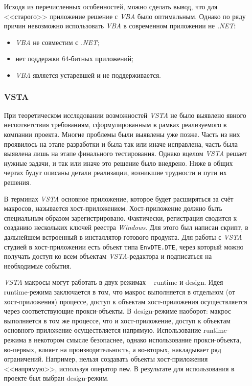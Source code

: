 Исходя из перечисленных особенностей, можно сделать вывод, что для <<старого>> приложение решение с {\it VBA} было оптимальным. Однако по ряду причин невозможно использовать {\it VBA} в современном приложении не {\it .NET}:

\begin{itemize}
   \item {\it VBA} не совместим с {\it .NET};
   \item нет поддержки 64-битных приложений;
   \item {\it VBA} является устаревшей и не поддерживается.
\end{itemize}


\subsubsection{VSTA}
\label{sec:use-itm-vsta}

При теоретическом исследовании возможностей {\it VSTA} не было выявлено явного несоответствия требованиям, сформулированным в рамках реализуемого в компании проекта. Многие проблемы были выявлены уже позже. Часть из них проявилось на этапе разработки и была так или иначе исправлена, часть была выявлена лишь на этапе финального тестирования. Однако вцелом {\it VSTA} решает нужные задачи, и так или иначе это решение было внедрено. Ниже в общих чертах будут описаны детали реализации, возникшие трудности и пути их решения.

В терминах {\it VSTA} основное приложение, которое будет расширяться за счёт макросов, называется хост-приложением. Хост-приложение должно быть специальным образом зарегистрировано. Фактически, регистрация сводится к созданию нескольких ключей реестра {\it Windows}. Для этого был написан скрипт, в дальнейшем встроенный в инсталлятор готового продукта. Для работы с {\it VSTA}-студией в хост-приложении есть объект типа {\tt EnvDTE.DTE}, через который можно получать доступ ко всем объектам {\it VSTA}-редактора и подписаться на необходимые события.

{\it VSTA}-макросы могут работать в двух режимах – runtime и design. Идея runtime-режима заключается в том, что макрос выполняется в отдельном (от хост-приложения) процессе, доступ к объектам хост-приложения осуществляется через соответствующие прокси-объекты. В design-режиме наоборот: макрос выполняется в том же процессе, что и хост-приложение, доступ к объектам основного приложение осуществляется напрямую. Использование runtime-режима в некотором смысле безопаснее, однако использование прокси-объекта, во-первых, влияет на производительность, а во-вторых, накладывает ряд ограничений. Например, нельзя создавать объекты хост-приложения <<напрямую>>, используя оператор {\tt new}. В результате для использования в проекте был выбран design-режим.

